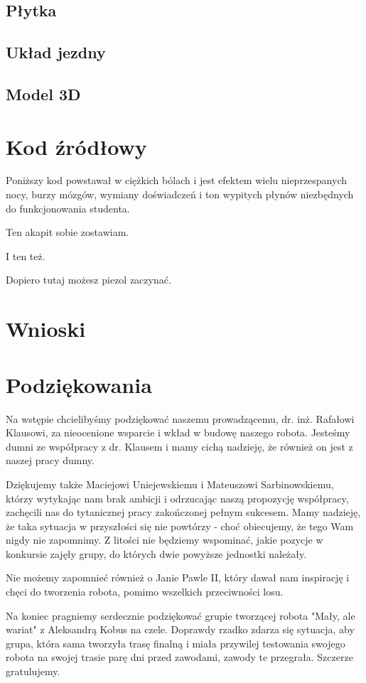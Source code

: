 \documentclass{article}
\begin{document}
\subsection{Płytka}


\subsection{Układ jezdny}


\subsection{Model 3D}

\section{Kod źródłowy}

Poniższy kod powstawał w ciężkich bólach i jest efektem wielu nieprzespanych nocy, burzy mózgów, wymiany doświadczeń i ton wypitych płynów niezbędnych do funkcjonowania studenta. 

Ten akapit sobie zostawiam.

I ten też.

Dopiero tutaj możesz piezol zaczynać.

\section{Wnioski}

\section{Podziękowania}

Na wstępie chcielibyśmy podziękować naszemu prowadzącemu, dr. inż. Rafałowi Klausowi,  za nieocenione wsparcie i wkład w budowę naszego robota. Jesteśmy dumni ze współpracy z dr. Klausem i mamy cichą nadzieję, że również on jest z naszej pracy dumny.

Dziękujemy także Maciejowi Uniejewskiemu i Mateuszowi Sarbinowskiemu, którzy  wytykając nam brak ambicji i odrzucając naszą propozycję współpracy, zachęcili nas do tytanicznej pracy zakończonej pełnym sukcesem. Mamy nadzieję, że taka sytuacja w przyszłości się nie powtórzy - choć obiecujemy, że tego Wam nigdy nie zapomnimy. Z litości nie będziemy wspominać, jakie pozycje w konkursie zajęły grupy, do których dwie powyższe jednostki należały.

Nie możemy zapomnieć również o Janie Pawle II, który dawał nam inspirację i chęci do tworzenia robota, pomimo wszelkich przeciwności losu.

Na koniec pragniemy serdecznie podziękować grupie tworzącej robota "Mały, ale wariat" z Aleksandrą Kobus na czele. Doprawdy rzadko zdarza się sytuacja, aby grupa, która sama tworzyła trasę finalną i miała przywilej testowania swojego robota na swojej trasie parę dni przed zawodami, zawody te przegrała. Szczerze gratulujemy.
\end{document}
